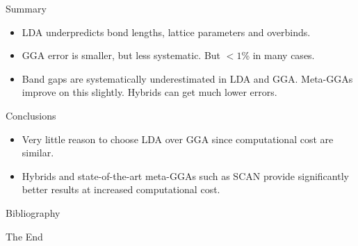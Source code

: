 \documentclass[aspectratio=169]{beamer}
\begin{document}
    \begin{frame}{Summary}
        \begin{itemize}
            \item LDA underpredicts bond lengths, lattice parameters and overbinds.
            \item GGA error is smaller, but less systematic. But $< 1$\% in many cases.
            \item Band gaps are systematically underestimated in LDA and GGA. Meta-GGAs improve on this slightly. Hybrids can get much lower errors.
        \end{itemize}

        \begin{alertblock}{Conclusions}
            \begin{itemize}
                \item Very little reason to choose LDA over GGA since computational cost are similar.
                \item Hybrids and state-of-the-art meta-GGAs such as SCAN provide significantly better results at increased computational cost.
            \end{itemize}

        \end{alertblock}

    \end{frame}


    \begin{frame}[allowframebreaks]{Bibliography}
        
        
    \end{frame}



    \begin{frame}
        \Huge{\centerline{The End}}
    \end{frame}
\end{document}
